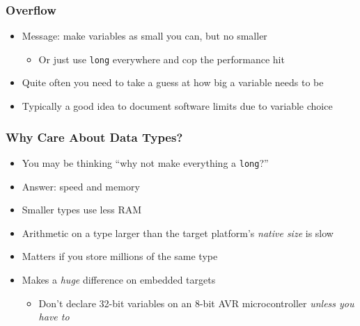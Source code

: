 \documentclass[14pt]{beamer}
\begin{document}
\begin{frame}
\frametitle{Overflow}
\begin{itemize}
\item Message: make variables as small you can, but no smaller
	\begin{itemize}
		\item Or just use \texttt{long} everywhere and cop the performance hit
	\end{itemize}
\item Quite often you need to take a guess at how big a variable needs to be
\item Typically a good idea to document software limits due to variable choice
\end{itemize}
\end{frame}

\begin{frame}
\frametitle{Why Care About Data Types?}
\begin{itemize}
\item You may be thinking ``why not make everything a \texttt{long}?''
\item Answer: speed and memory
\item Smaller types use less RAM
\item Arithmetic on a type larger than the target platform's \textit{native size} is slow
\item Matters if you store millions of the same type
\item Makes a \textit{huge} difference on embedded targets
\begin{itemize}
	\item Don't declare 32-bit variables on an 8-bit AVR microcontroller \textit{unless you have to}
\end{itemize}
\end{itemize}
\end{frame}
\end{document}
